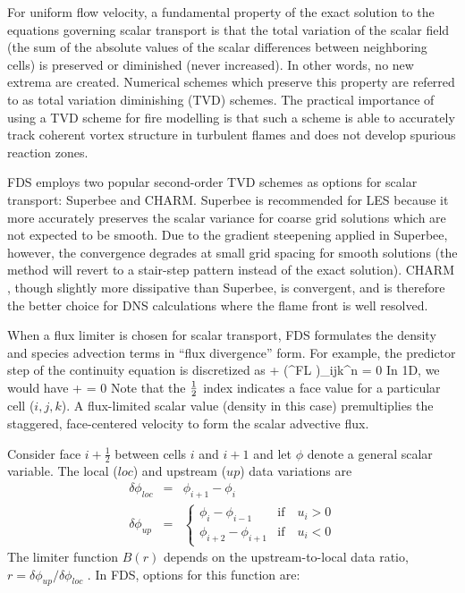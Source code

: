 For uniform flow velocity, a fundamental property of the exact solution to the equations governing scalar transport is that the total variation of the scalar field (the sum of the absolute values of the scalar differences between neighboring cells) is preserved or diminished (never increased).  In other words, no new extrema are created.  Numerical schemes which preserve this property are referred to as total variation diminishing (TVD) schemes.  The practical importance of using a TVD scheme for fire modelling is that such a scheme is able to accurately track coherent vortex structure in turbulent flames and does not develop spurious reaction zones.

FDS employs two popular second-order TVD schemes as options for scalar transport: Superbee and CHARM.  Superbee \cite{Roe:1986} is recommended for LES because it more accurately preserves the scalar variance for coarse grid solutions which are not expected to be smooth.  Due to the gradient steepening applied in Superbee, however, the convergence degrades at small grid spacing for smooth solutions (the method will revert to a stair-step pattern instead of the exact solution).  CHARM \cite{Zhou:1995}, though slightly more dissipative than Superbee, is convergent, and is therefore the better choice for DNS calculations where the flame front is well resolved.

When a flux limiter is chosen for scalar transport, FDS formulates the density and species advection terms in ``flux divergence'' form.  For example, the predictor step of the continuity equation is discretized as
\be  {}
    + \nabla\!\cdot(\overline{\rho}^{FL} )_{ijk}^n = 0
\ee
In 1D, we would have
\be  {}
    +  = 0
\ee
Note that the $\frac{1}{2}$ index indicates a face value for a particular cell ($i,j,k$). A flux-limited scalar value (density in this case) premultiplies the staggered, face-centered velocity to form the scalar advective flux.

Consider face $i+\frac{1}{2}$ between cells $i$ and $i+1$ and let $\phi$ denote a general scalar variable.  The local ($loc$) and upstream ($up$) data variations are
\begin{eqnarray}
\delta \phi_{loc} &=& \phi_{i+1}-\phi_i \nonumber\\
\delta \phi_{up}  &=& \left\{ \begin{array}{ll} \phi_i-\phi_{i-1} & \mbox{if} \quad u_i>0 \\ \phi_{i+2}-\phi_{i+1} & \mbox{if} \quad u_i<0 \end{array} \right. \nonumber
\end{eqnarray}
The limiter function $B(r)$ depends on the upstream-to-local data ratio, $r=\delta \phi_{up}/\delta \phi_{loc}$ \cite{Toro}.  In FDS, options for this function are:

